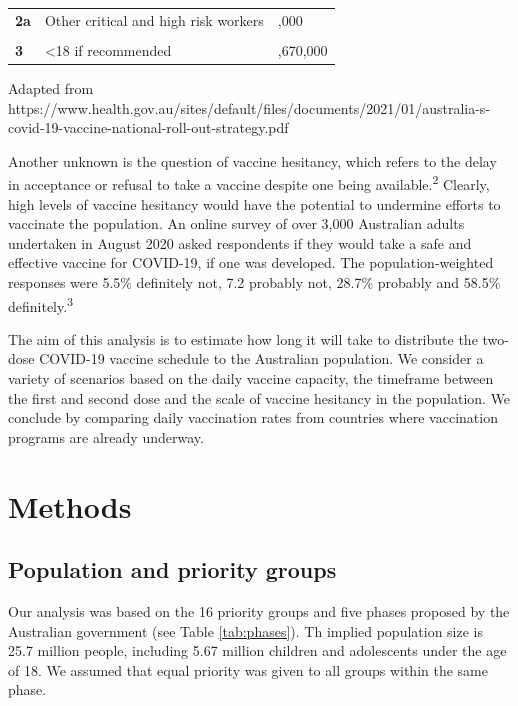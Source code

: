 \documentclass{article}
\begin{document}
\begin{table}[H]
\begin{threeparttable}
\begin{tabular}[t]{>{\raggedright\arraybackslash}p{1cm}>{\raggedright\arraybackslash}p{11cm}>{\raggedleft\arraybackslash}p{2cm}}
\textbf{2a} & Other critical and high risk workers & 453,000\\
\textbf{\cellcolor{gray!6}{2b}} & \cellcolor{gray!6}{Balance of adult population} & \cellcolor{gray!6}{6,643,000}\\
\textbf{3} & <18 if recommended & 5,670,000\\
\bottomrule
\end{tabular}
\begin{tablenotes}
\small
\item [] Adapted from https://www.health.gov.au/sites/default/files/documents/2021/01/australia-s-covid-19-vaccine-national-roll-out-strategy.pdf
\end{tablenotes}
\end{threeparttable}
\end{table}

Another unknown is the question of vaccine hesitancy, which refers to
the delay in acceptance or refusal to take a vaccine despite one being
available.\textsuperscript{2} Clearly, high levels of vaccine hesitancy
would have the potential to undermine efforts to vaccinate the
population. An online survey of over 3,000 Australian adults undertaken
in August 2020 asked respondents if they would take a safe and effective
vaccine for COVID-19, if one was developed. The population-weighted
responses were 5.5\% definitely not, 7.2 probably not, 28.7\% probably
and 58.5\% definitely.\textsuperscript{3}

The aim of this analysis is to estimate how long it will take to
distribute the two-dose COVID-19 vaccine schedule to the Australian
population. We consider a variety of scenarios based on the daily
vaccine capacity, the timeframe between the first and second dose and
the scale of vaccine hesitancy in the population. We conclude by
comparing daily vaccination rates from countries where vaccination
programs are already underway.

\hypertarget{methods}{%
\section{Methods}\label{methods}}

\hypertarget{population-and-priority-groups}{%
\subsection{Population and priority
groups}\label{population-and-priority-groups}}

Our analysis was based on the 16 priority groups and five phases
proposed by the Australian government (see Table \ref{tab:phases}). Th
implied population size is 25.7 million people, including 5.67 million
children and adolescents under the age of 18. We assumed that equal
priority was given to all groups within the same phase.
\end{document}

